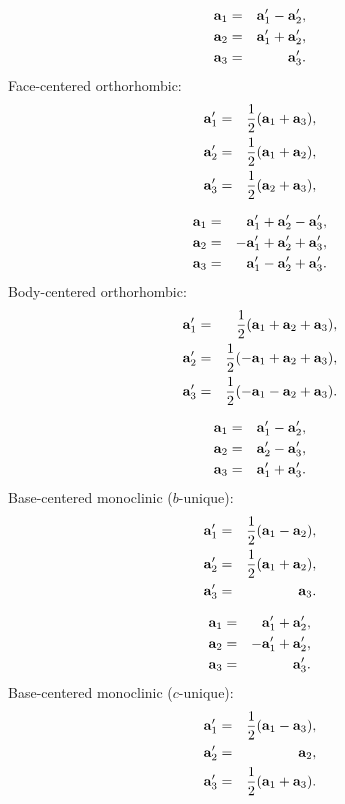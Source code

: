 \documentclass[12pt,a4paper]{article}
\begin{document}
\begin{eqnarray}
{\bf a}_1&=&  {\bf a}_1' - {\bf a}_2', \\
{\bf a}_2&=&  {\bf a}_1' + {\bf a}_2', \\
{\bf a}_3&=& {\bf a}_3'.
\end{eqnarray}
Face-centered orthorhombic:
\begin{eqnarray}
{\bf a}_1'&=&{1\over 2} ({\bf a}_1 + {\bf a}_3), \\
{\bf a}_2'&=&{1\over 2} ({\bf a}_1 + {\bf a}_2), \\
{\bf a}_3'&=&{1\over 2} ({\bf a}_2 + {\bf a}_3), \\
\end{eqnarray}

\begin{eqnarray}
{\bf a}_1&=&  {\bf a}_1' + {\bf a}_2' - {\bf a}_3', \\
{\bf a}_2&=& -{\bf a}_1' + {\bf a}_2' + {\bf a}_3', \\
{\bf a}_3&=&  {\bf a}_1' - {\bf a}_2' + {\bf a}_3'.
\end{eqnarray}
Body-centered orthorhombic:
\begin{eqnarray}
{\bf a}_1'&=&{1\over 2} ({\bf a}_1 + {\bf a}_2 + {\bf a}_3), \\
{\bf a}_2'&=&{1\over 2} (-{\bf a}_1 + {\bf a}_2 + {\bf a}_3), \\
{\bf a}_3'&=&{1\over 2} (-{\bf a}_1 - {\bf a}_2 + {\bf a}_3). 
\end{eqnarray}

\begin{eqnarray}
{\bf a}_1&=&  {\bf a}_1' - {\bf a}_2', \\
{\bf a}_2&=&  {\bf a}_2' - {\bf a}_3', \\
{\bf a}_3&=& {\bf a}_1' + {\bf a}_3'.
\end{eqnarray}
Base-centered monoclinic ($b$-unique):
\begin{eqnarray}
{\bf a}_1'&=&{1\over 2} ({\bf a}_1 - {\bf a}_2), \\
{\bf a}_2'&=&{1\over 2} ({\bf a}_1 + {\bf a}_2), \\
{\bf a}_3'&=&{\bf a}_3. 
\end{eqnarray}

\begin{eqnarray}
{\bf a}_1&=&  {\bf a}_1' + {\bf a}_2', \\
{\bf a}_2&=& -{\bf a}_1' + {\bf a}_2', \\
{\bf a}_3&=& {\bf a}_3'.
\end{eqnarray}
Base-centered monoclinic ($c$-unique):
\begin{eqnarray}
{\bf a}_1'&=&{1\over 2} ({\bf a}_1 - {\bf a}_3), \\
{\bf a}_2'&=&{\bf a}_2, \\
{\bf a}_3'&=&{1\over 2} ({\bf a}_1 + {\bf a}_3). 
\end{eqnarray}
\end{document}
